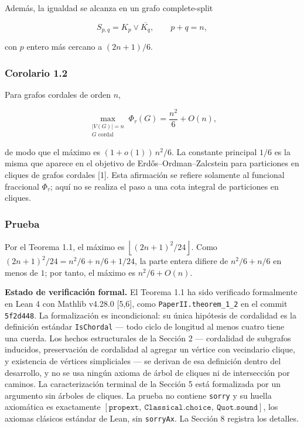 \documentclass[
  11pt,
]{article}
\begin{document}
Además, la igualdad se alcanza en un grafo complete-split

\[
S_{p,q}=K_p\vee\overline{K_q},
\qquad
p+q=n,
\]

con \(p\) entero más cercano a \((2n+1)/6\).

\subsubsection{Corolario 1.2}\label{corolario-1.2}

Para grafos cordales de orden \(n\),

\[
\max_{\substack{|V(G)|=n\\G\text{ cordal}}}\Phi_\tau(G)=\frac{n^2}{6}+O(n),
\]

de modo que el máximo es \((1+o(1))\,n^2/6\). La constante principal
\(1/6\) es la misma que aparece en el objetivo de
Erdős--Ordman--Zalcstein para particiones en cliques de grafos cordales
{[}1{]}. Esta afirmación se refiere solamente al funcional fraccional
\(\Phi_\tau\); aquí no se realiza el paso a una cota integral de
particiones en cliques.

\subsubsection{Prueba}\label{prueba}

Por el Teorema 1.1, el máximo es
\(\left\lfloor(2n+1)^2/24\right\rfloor\). Como
\((2n+1)^2/24=n^2/6+n/6+1/24\), la parte entera difiere de \(n^2/6+n/6\)
en menos de \(1\); por tanto, el máximo es \(n^2/6+O(n)\).

\textbf{Estado de verificación formal.} El Teorema 1.1 ha sido
verificado formalmente en Lean 4 con Mathlib v4.28.0 {[}5,6{]}, como
\texttt{PaperII.theorem\_1\_2} en el commit \texttt{5f2d448}. La
formalización es incondicional: su única hipótesis de cordalidad es la
definición estándar \texttt{IsChordal} --- todo ciclo de longitud al
menos cuatro tiene una cuerda. Los hechos estructurales de la Sección 2
--- cordalidad de subgrafos inducidos, preservación de cordalidad al
agregar un vértice con vecindario clique, y existencia de vértices
simpliciales --- se derivan de esa definición dentro del desarrollo, y
no se usa ningún axioma de árbol de cliques ni de intersección por
caminos. La caracterización terminal de la Sección 5 está formalizada
por un argumento sin árboles de cliques. La prueba no contiene
\texttt{sorry} y su huella axiomática es exactamente
\([\texttt{propext},\ \texttt{Classical.choice},\ \texttt{Quot.sound}]\),
los axiomas clásicos estándar de Lean, sin \texttt{sorryAx}. La Sección
8 registra los detalles.
\end{document}

